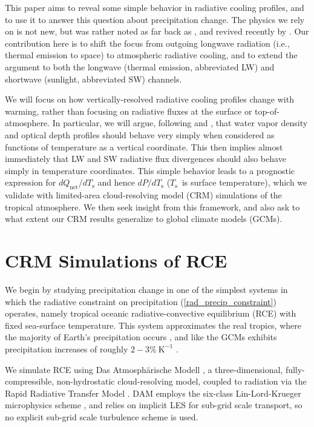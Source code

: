 \documentclass[9pt,twocolumn,twoside,lineno]{pnas-new}
\newcommand{\eqnref}[1]{(\ref{#1})}
\newcommand{\Qnet}{\ensuremath{Q_\mathrm{net}}}
\newcommand{\Ts}{\ensuremath{T_\mathrm{s}}}
\newcommand{\Kinverse}{\ensuremath{\mathrm{K^{-1}}}}
\begin{document}
This paper aims to reveal some simple behavior in radiative cooling profiles, and to use it to  answer this question about precipitation change. The physics we rely on is not new, but was rather noted as far back as \cite{simpson1928}, and revived recently by \cite{ingram2010}. Our contribution here is to shift the focus from outgoing longwave radiation (i.e., thermal emission to space) to atmospheric radiative cooling, and to extend the argument to both the longwave (thermal emission, abbreviated LW) and shortwave (sunlight, abbreviated SW) channels. 

We will  focus on how vertically-resolved radiative cooling profiles change with warming, rather than focusing on radiative fluxes at the surface or top-of-atmosphere. In particular, we will argue, following \cite{simpson1928} and \cite{ingram2010}, that water vapor density and optical depth profiles should behave very simply when considered as functions of temperature as a vertical coordinate. This then implies almost immediately that LW and SW radiative flux divergences should also behave simply in temperature coordinates. This simple behavior leads to a prognostic expression for $d\Qnet/d\Ts$ and hence $dP/d\Ts$ (\Ts\ is surface temperature), which we validate with limited-area cloud-resolving model (CRM) simulations of the tropical atmosphere. We then seek insight from this framework, and also ask to what extent our CRM results generalize to global climate models (GCMs).

\section{CRM Simulations of RCE}
We begin by studying precipitation change in one of the simplest systems in which the radiative constraint on precipitation \eqnref{rad_precip_constraint} operates, namely tropical oceanic radiative-convective equilibrium (RCE) with fixed sea-surface temperature. This system approximates the real tropics, where the majority of Earth's precipitation occurs \cite{simpson1988}, and like the GCMs exhibits precipitation increases of roughly $2 -3\%\ \Kinverse$ \cite{romps2011, muller2011b}.  

We simulate RCE using Das Atmosph\"arische Modell \cite[DAM,][]{romps2008},   a three-dimensional, fully-compressible, non-hydrostatic cloud-resolving model, coupled to radiation via the Rapid Radiative Transfer Model 
\cite[RRTM,][]{mlawer1997}. DAM employs the six-class Lin-Lord-Krueger  microphysics scheme \cite{lin1983, lord1984, krueger1995}, and relies on implicit LES \cite{margolin2006} for sub-grid scale transport, so no explicit sub-grid scale turbulence scheme is used.
\end{document}
